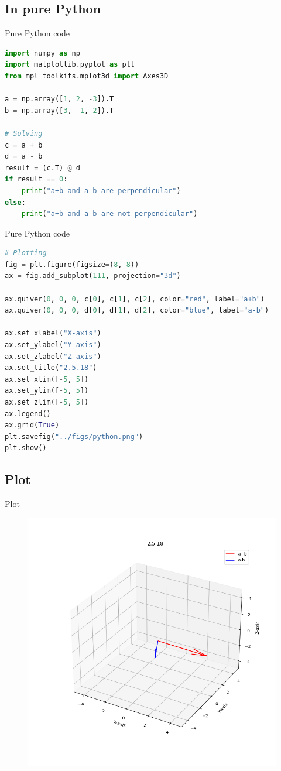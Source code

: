 \documentclass{beamer}
\theoremstyle{remark}
\numberwithin{equation}{section}
\begin{document}
\subsection{In pure Python}
\begin{frame}[fragile]{Pure Python code}
 \begin{lstlisting}[language=Python]
import numpy as np
import matplotlib.pyplot as plt
from mpl_toolkits.mplot3d import Axes3D

a = np.array([1, 2, -3]).T
b = np.array([3, -1, 2]).T

# Solving
c = a + b
d = a - b
result = (c.T) @ d
if result == 0:
    print("a+b and a-b are perpendicular")
else:
    print("a+b and a-b are not perpendicular")
 \end{lstlisting}
\end{frame}
\begin{frame}[fragile]{Pure Python code}
 \begin{lstlisting}[language=Python]
# Plotting
fig = plt.figure(figsize=(8, 8))
ax = fig.add_subplot(111, projection="3d")

ax.quiver(0, 0, 0, c[0], c[1], c[2], color="red", label="a+b")
ax.quiver(0, 0, 0, d[0], d[1], d[2], color="blue", label="a-b")

ax.set_xlabel("X-axis")
ax.set_ylabel("Y-axis")
ax.set_zlabel("Z-axis")
ax.set_title("2.5.18")
ax.set_xlim([-5, 5])
ax.set_ylim([-5, 5])
ax.set_zlim([-5, 5])
ax.legend()
ax.grid(True)
plt.savefig("../figs/python.png")
plt.show()
 \end{lstlisting}
\end{frame}
\subsection{Plot}
\begin{frame}{Plot}
 \begin{figure}[H]
    \centering
    \includegraphics{../figs/python.png}
    \caption*{}
    \label{fig:plot}
\end{figure}
\end{frame}
\end{document}

